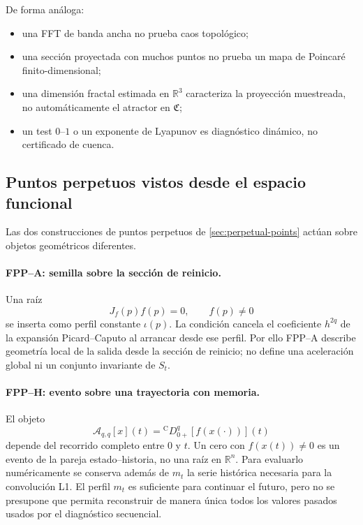 De forma análoga:
\begin{itemize}
 \item una FFT de banda ancha no prueba caos topológico;
 \item una sección proyectada con muchos puntos no prueba un mapa de Poincaré
 finito-dimensional;
 \item una dimensión fractal estimada en \(\mathbb R^3\) caracteriza la
 proyección muestreada, no automáticamente el atractor en \(\mathfrak C\);
 \item un test \(0\)--\(1\) o un exponente de Lyapunov es diagnóstico dinámico,
 no certificado de cuenca.
\end{itemize}

\subsection{Puntos perpetuos vistos desde el espacio funcional}

Las dos construcciones de puntos perpetuos de \cref{sec:perpetual-points}
actúan sobre objetos geométricos diferentes.

\paragraph{FPP--A: semilla sobre la sección de reinicio.}
Una raíz
\begin{equation}
 J_f(p)f(p)=0,\qquad f(p)\neq0
 \label{eq:geofo-fppa}
\end{equation}
se inserta como perfil constante \(\iota(p)\). La condición cancela el
coeficiente \(h^{2q}\) de la expansión Picard--Caputo al arrancar desde ese
perfil. Por ello FPP--A describe geometría local de la salida desde la sección
de reinicio; no define una aceleración global ni un conjunto invariante de
\(S_t\).

\paragraph{FPP--H: evento sobre una trayectoria con memoria.}
El objeto
\begin{equation}
 \mathcal A_{q,q}[x](t)=
 {}^{\mathrm C}D_{0+}^{q}[f(x(\cdot))](t)
 \label{eq:geofo-fpph}
\end{equation}
depende del recorrido completo entre \(0\) y \(t\). Un cero con
\(f(x(t))\neq0\) es un evento de la pareja estado--historia, no una raíz en
\(\mathbb R^n\). Para evaluarlo numéricamente se conserva además de \(m_t\) la
serie histórica necesaria para la convolución L1. El perfil \(m_t\) es
suficiente para continuar el futuro, pero no se presupone que permita
reconstruir de manera única todos los valores pasados usados por el diagnóstico
secuencial.

